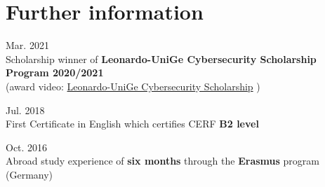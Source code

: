 \documentclass[a4paper,10pt]{article}
\newcommand{\MySkip}{
\vskip12pt
}
\newcommand{\myhref}[2]{%
\href{#1}{\textcolor{ColorTwo}{#2}}
}
\begin{document}
\begin{adjustbox}{valign=t}
\begin{minipage}{0.6\textwidth} %
\section*{Further information}
\begin{description}
	\raggedright
	\item \textcolor{ColorOne}{Mar. 2021}\\
	Scholarship winner of \textbf{Leonardo-UniGe Cybersecurity Scholarship Program 2020/2021}\\
    (award video: \myhref{https://www.youtube.com/watch?v=gA4rcqAIaZg}{Leonardo-UniGe Cybersecurity Scholarship})
    \item \textcolor{ColorOne}{Jul. 2018}\\
    First Certificate in English which certifies CERF \textbf{B2 level}
    \item \textcolor{ColorOne}{Oct. 2016}\\
    Abroad study experience of \textbf{six months} through the \textbf{Erasmus} program (Germany)
\end{description}

\MySkip
\end{minipage}
\end{adjustbox}
\end{document}
